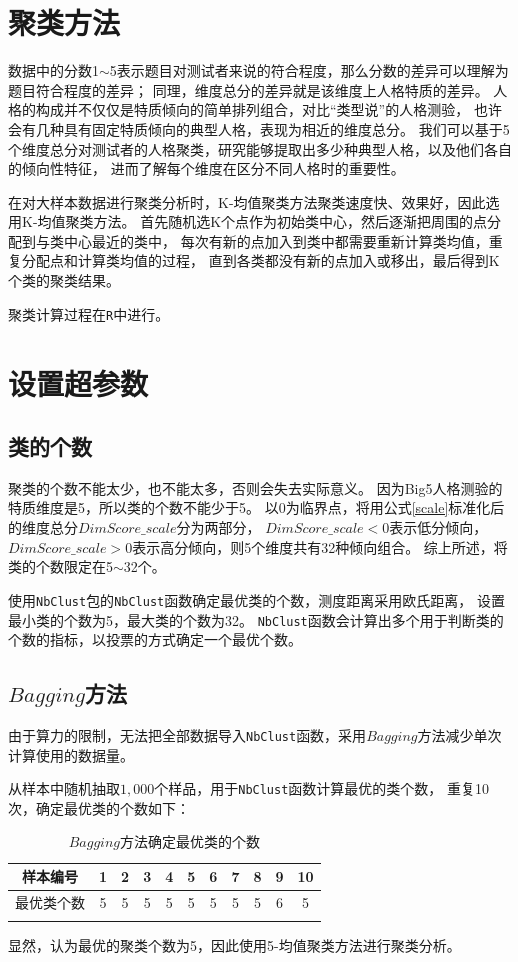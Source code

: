 \documentclass[UTF8]{ctexart}
\begin{document}
\section{聚类方法}
数据中的分数1$\sim$5表示题目对测试者来说的符合程度，那么分数的差异可以理解为题目符合程度的差异；
同理，维度总分的差异就是该维度上人格特质的差异。
人格的构成并不仅仅是特质倾向的简单排列组合，对比“类型说”的人格测验，
也许会有几种具有固定特质倾向的典型人格，表现为相近的维度总分。
我们可以基于5个维度总分对测试者的人格聚类，研究能够提取出多少种典型人格，以及他们各自的倾向性特征，
进而了解每个维度在区分不同人格时的重要性。\par
在对大样本数据进行聚类分析时，K-均值聚类方法聚类速度快、效果好，因此选用K-均值聚类方法。
首先随机选K个点作为初始类中心，然后逐渐把周围的点分配到与类中心最近的类中，
每次有新的点加入到类中都需要重新计算类均值，重复分配点和计算类均值的过程，
直到各类都没有新的点加入或移出，最后得到K个类的聚类结果。\par
聚类计算过程在\texttt{R}中进行。
\section{设置超参数}
\subsection*{类的个数}
聚类的个数不能太少，也不能太多，否则会失去实际意义。
因为Big5人格测验的特质维度是5，所以类的个数不能少于5。
以0为临界点，将用公式\ref{scale}标准化后的维度总分$DimScore\_scale$分为两部分，
$DimScore\_scale<0$表示低分倾向，$DimScore\_scale>0$表示高分倾向，则5个维度共有32种倾向组合。
综上所述，将类的个数限定在5$\sim$32个。\par
使用\texttt{NbClust}包的\texttt{NbClust}函数确定最优类的个数，测度距离采用欧氏距离，
设置最小类的个数为5，最大类的个数为32。
\texttt{NbClust}函数会计算出多个用于判断类的个数的指标，以投票的方式确定一个最优个数。
\subsection*{$Bagging$方法}
由于算力的限制，无法把全部数据导入\texttt{NbClust}函数，采用$Bagging$方法减少单次计算使用的数据量。\par
从样本中随机抽取$1,000$个样品，用于\texttt{NbClust}函数计算最优的类个数，
重复10次，确定最优类的个数如下：
\begin{longtable}{c|cccccccccc}
  \hline
  样本编号  & 1 & 2 & 3 & 4 & 5 & 6 & 7 & 8 & 9 & 10 \\\hline
  最优类个数 & 5 & 5 & 5 & 5 & 5 & 5 & 5 & 5 & 6 & 5  \\\hline
  \caption{$Bagging$方法确定最优类的个数}
\end{longtable}
显然，认为最优的聚类个数为5，因此使用5-均值聚类方法进行聚类分析。
\end{document}

